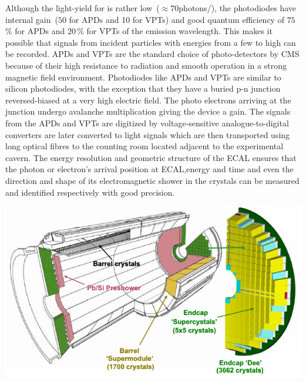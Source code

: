 Although the light-yield for \pb is rather low~($\approx 70$photons/\MeV), the photodiodes have internal gain~($50$ for APDs and 10 for VPTs) and good quantum efficiency
of $75$\,\% for APDs and $20$\,\% for VPTs of the emission wavelength. This makes it possible that signals 
from incident particles with energies from a few to high \GeV can be recorded.
APDs and VPTs are the standard choice of photo-detectors by CMS because of their high resistance to radiation and smooth operation in a strong magnetic field environment. Photodiodes like APDs and VPTs are similar to silicon photodiodes, with the exception that they have a buried p-n junction reversed-biased at a very high electric field. The photo electrons arriving at the junction undergo avalanche multiplication giving the device a gain.
The signals from the APDs and VPTs are digitized by voltage-sensitive analogue-to-digital converters are later converted to light signals which are then transported using long optical fibres to the counting room located adjacent to the experimental cavern.
\newline
The energy resolution and geometric structure of the ECAL ensures that the photon or electron's arrival position at ECAL,energy and time and even the direction and shape of its electromagnetic shower in the crystals can be measured and identified respectively with good precision.

\begin{center}
\centering
\mbox{\includegraphics[scale=0.6]{THESISPLOTS/CMS-ECAL-EB-EE.png}}
\label{fig:CMSECAL}
\end{center}






